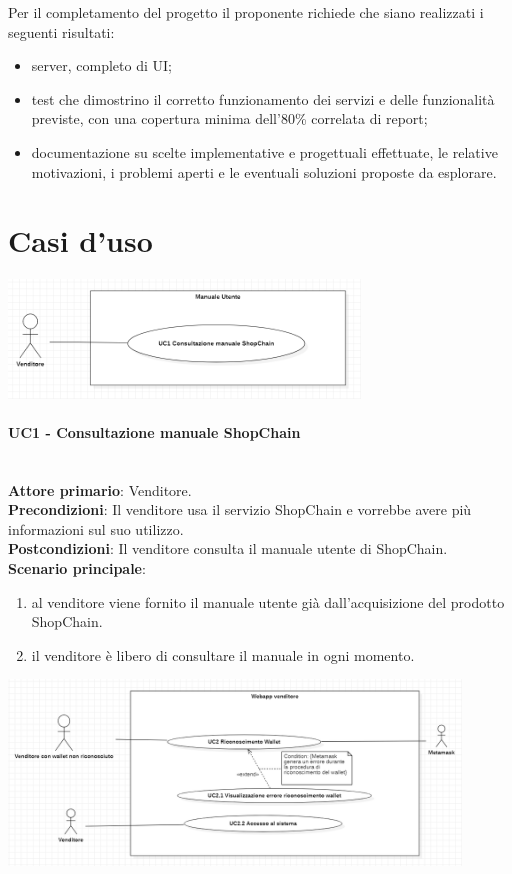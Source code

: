 \documentclass[a4paper, 12pt]{article}
\begin{document}
Per il completamento del progetto il proponente richiede che siano realizzati i seguenti risultati:
\begin{itemize}
\item server, completo di UI;
\item test che dimostrino il corretto funzionamento dei servizi e delle funzionalità previste, con una copertura minima dell'80\% correlata di report;
\item documentazione su scelte implementative e progettuali effettuate, le relative motivazioni, i problemi aperti e le eventuali soluzioni proposte da esplorare.
\end{itemize}

\section{Casi d'uso}

\includegraphics[width=0.7\textwidth]{UseCase_venditore1.png}

\paragraph{UC1 - Consultazione manuale ShopChain}\\
\textbf{Attore primario}: Venditore.\\
\textbf{Precondizioni}: Il venditore usa il servizio ShopChain e vorrebbe avere più informazioni sul suo utilizzo.\\
\textbf{Postcondizioni}: Il venditore consulta il manuale utente di ShopChain.\\
\textbf{Scenario principale}:\\
\begin{enumerate}
\item al venditore viene fornito il manuale utente già dall'acquisizione del prodotto ShopChain.
\item il venditore è libero di consultare il manuale in ogni momento.
\end{enumerate}

\includegraphics[width=0.9\textwidth]{UseCase_venditore2.png}
\end{document}
